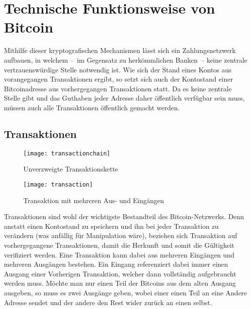 \section{Technische Funktionsweise von Bitcoin}
\label{sec:mechanics}

Mithilfe dieser kryptografischen Mechanismen lässt sich ein Zahlungsnetzwerk aufbauen, in welchem --~im Gegensatz zu herkömmlichen Banken~-- keine zentrale vertrauenswürdige Stelle notwendig ist.
Wie sich der Stand eines Kontos aus vorangegangen Transaktionen ergibt, so setzt sich auch der Kontostand einer Bitcoinadresse aus vorhergegangen Transaktionen statt.
Da es keine zentrale Stelle gibt und das Guthaben jeder Adresse daher öffentlich verfügbar sein muss, müssen auch alle Transaktionen öffentlich gemacht werden.

\subsection{Transaktionen}

\begin{figure}
    \begin{center}
        \texttt{[image: transactionchain]}
    	\caption{Unverzweigte Transaktionskette \parencite[2]{nakamoto}}
    	\label{fig:transactionchain}
    \end{center}
\end{figure}

\begin{figure}
    \begin{center}
		\texttt{[image: transaction]}
    	\caption{Transaktion mit mehreren Aus- und Eingängen \parencite[5]{nakamoto}}
    	\label{fig:transaction}
    \end{center}
\end{figure}

Transaktionen sind wohl der wichtigste Bestandteil des Bitcoin-Netzwerks.
Denn anstatt einen Kontostand zu speichern und ihn bei jeder Transaktion zu verändern (was anfällig für Manipulation wäre), beziehen sich Transaktion auf vorhergegangene Transaktionen, damit die Herkunft und somit die Gültigkeit verifiziert werden.
Eine Transaktion kann dabei aus mehreren Eingängen und mehreren Ausgängen bestehen.
Ein Eingang referenziert dabei immer einen Ausgang einer Vorherigen Transaktion, welcher dann vollständig aufgebraucht werden muss.
Möchte man nur einen Teil der Bitcoins aus dem alten Ausgang ausgeben, so muss es zwei Ausgänge geben, wobei einer einen Teil an eine Andere Adresse sendet und der andere den Rest wider zurück an einen selbst.



